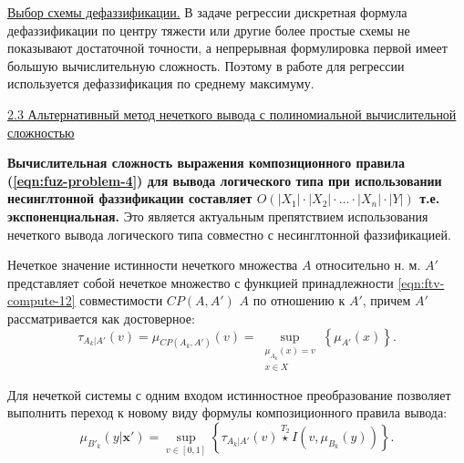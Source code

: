 \ul{Выбор схемы дефаззификации.}
В задаче регрессии дискретная формула дефаззификации по центру тяжести или другие более простые схемы не показывают достаточной точности, а непрерывная формулировка первой имеет большую вычислительную сложность. Поэтому в работе для регрессии используется дефаззификация по среднему максимуму.

%

\ul{2.3 Альтернативный метод нечеткого вывода с полиномиальной вычислительной сложностью}

\textbf{Вычислительная сложность выражения композиционного правила (\ref{eqn:fuz-problem-4}) для вывода логического типа при использовании несинглтонной фаззификации составляет ${O(|X_1|\cdot |X_2|\cdot \dots \cdot |X_n|\cdot |Y|)}$ т.е. экспоненциальная.} Это является актуальным препятствием использования нечеткого вывода логического типа совместно с несинглтонной фаззификацией.

Нечеткое значение истинности нечеткого множества $A$ относительно н. м. $A'$ представляет собой нечеткое множество с функцией принадлежности \eqref{eqn:ftv-compute-12} совместимости $CP(A, A')$ $A$ по отношению к $A'$, причем $A'$ рассматривается как достоверное:
\begin{equation}
	\label{eqn:ftv-compute-12}
	\tau_{A_k|A'}(v) = \mu_{CP(A_k, A')}(v) = \sup_{\substack{\mu_{A_k}(x) = v \\ x \in X}} \left\{ \mu_{A'}(x)\right\}.
\end{equation}


Для нечеткой системы с одним входом истинностное преобразование позволяет выполнить переход к новому виду формулы композиционного правила вывода:
\begin{equation}
	\label{eqn:ftv-compute-5}
	\mu_{B'_k}(y|\mathbf{x'}) = \sup_{v \in [0,1]}\left\{\tau_{A_k|A'}(v) \overset{T_2}{\star} I(v, \mu_{B_k}(y))\right\}.
\end{equation}

